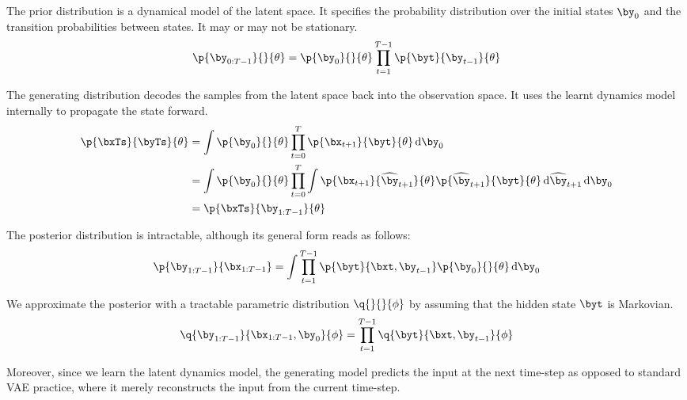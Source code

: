\documentclass[]{article}
\begin{document}
	\begin{description}[leftmargin=\parindent]
		\item[prior] The prior distribution is a dynamical model of the latent space. It specifies the probability distribution over the initial states $\by_0$ and the transition probabilities between states. It may or may not be stationary.
		\begin{equation}
		\p{\by_{0:T-1}}{}{\theta} = \p{\by_0}{}{\theta} \prod_{t=1}^{T-1} \p{\byt}{\by_{t-1}}{\theta}
		\end{equation}
		
		\item[generating distribution] The generating distribution decodes the samples from the latent space back into the observation space. It uses the learnt dynamics model internally to propagate the state forward.
		\begin{equation}
			\begin{aligned}
				\p{\bxTs}{\byTs}{\theta} &= \int \p{\by_0}{}{\theta} \prod_{t=0}^T \p{\bx_{t+1}}{\byt}{\theta}\dint \by_0 \\
				&= \int \p{\by_0}{}{\theta} \prod_{t=0}^T \int \p{\bx_{t+1}}{\widehat{\by}_{t+1}}{\theta} \p{\widehat{\by}_{t+1}}{\byt}{\theta} \dint \widehat{\by}_{t+1} \dint \by_0 \\
				&= \p{\bxTs}{\by_{1:T-1}}{\theta}
			\end{aligned}
		\end{equation}
	
		\item[posterior distribution] The posterior distribution is intractable, although its general form reads as follows:
		\begin{equation}
			\p{\by_{1:T-1}}{\bx_{1:T-1}} = \int \prod_{t=1}^{T-1} \p{\byt}{\bxt, \by_{t-1}} \p{\by_0}{}{\theta} \dint \by_0
		\end{equation}
		
		\item[approximate posterior] We approximate the posterior with a tractable parametric distribution $\q{}{}{\phi}$ by assuming that the hidden state $\byt$ is Markovian.
		\begin{equation}
			\q{\by_{1:T-1}}{\bx_{1:T-1}, \by_0}{\phi} = \prod_{t=1}^{T-1} \q{\byt}{\bxt, \by_{t-1}}{\phi}
		\end{equation}
	\end{description}
	Moreover, since we learn the latent dynamics model, the generating model predicts the input at the next time-step as opposed to standard VAE practice, where it merely reconstructs the input from the current time-step.
	
\end{document}
